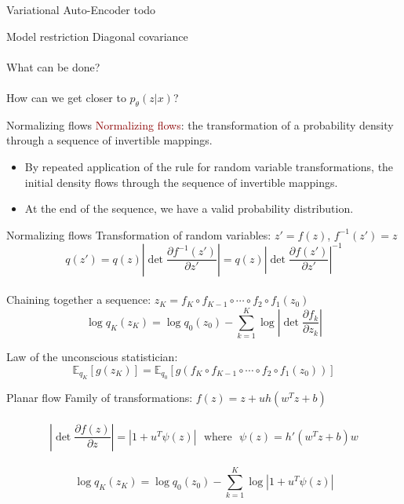 \documentclass[unicode,11pt]{beamer}
\begin{document}
\begin{frame}[fragile]{Variational Auto-Encoder}
todo 
\end{frame}

\begin{frame}[fragile]{Model restriction}
  Diagonal covariance\\
  ~\\
  What can be done?\\
  ~\\
  How can we get closer to $p_{\theta}(z|x)$?
\end{frame}

\begin{frame}[fragile]{Normalizing flows}
  \textcolor{darkred}{Normalizing flows}: the transformation of a probability density through 
  a sequence of invertible mappings.
  \begin{itemize}
    \item By repeated application of the rule for random variable transformations, the initial 
    density flows through the sequence of invertible mappings.
    \item At the end of the sequence, we have a valid probability distribution.
  \end{itemize}

\end{frame}

\begin{frame}[fragile]{Normalizing flows}
  Transformation of random variables: $z' = f(z)$, $f^{-1}(z') = z$\\
  $$q(z') = q(z) \left\vert \det \frac{\partial f^{-1}(z')}{\partial z'} \right\vert = 
  q(z) \left\vert \det \frac{\partial f(z')}{\partial z'} \right\vert^{-1}$$\\
  Chaining together a sequence: $z_K = f_K \circ f_{K−1} \circ \cdots \circ f_2 \circ f_1(z_0)$\\
  $$\log q_K(z_K) = \log q_0(z_0) − \sum_{k=1}^K \log \left\vert \det \frac{\partial f_k}{\partial z_k} \right\vert $$

  Law of the unconscious statistician:\\
  $$\mathbb{E}_{q_K} \left[g(z_K)\right] = \mathbb{E}_{q_0} \left[ g(f_K \circ f_{K−1} \circ \cdots \circ f_2 
  \circ f_1(z_0)) \right] $$
\end{frame}

\begin{frame}[fragile]{Planar flow}
  Family of transformations: $f(z) = z + uh\left( w^T z + b \right)$\\
  ~\\
  $$\left\vert \det \frac{\partial f(z)}{\partial z} \right\vert = \left\vert 1 + u^T \psi(z) 
  \right\vert ~~~\text{where}~~~ \psi(z) = h'(w^Tz + b)w$$ \\
  $$\log q_K(z_K) = \log q_0(z_0) − \sum_{k=1}^K \log \left\vert 1 + u^T \psi(z) \right\vert $$
\end{frame}
\end{document}
